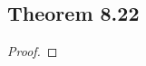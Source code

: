 \documentclass[../../main.tex]{subfiles}
\begin{document}
\subsection{Theorem 8.22}
\begin{wts}

\end{wts}
\begin{proof}

\end{proof}
\end{document}
